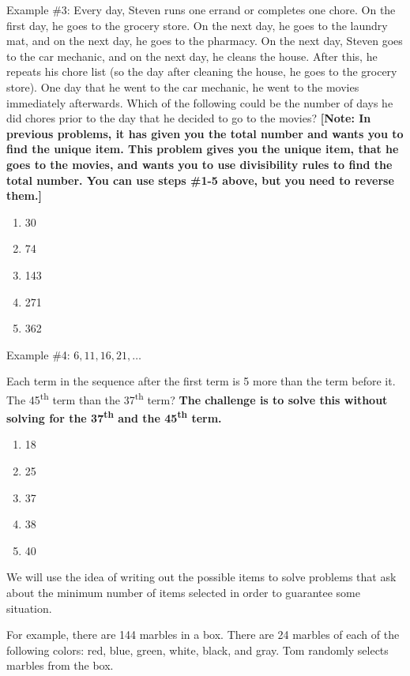 \vfill
Example \#3: Every day, Steven runs one errand or completes one chore. On the first day, he goes to the grocery store. On the next day, he goes to the laundry mat, and on the next day, he goes to the pharmacy. On the next day, Steven goes to the car mechanic, and on the next day, he cleans the house. After this, he repeats his chore list (so the day after cleaning the house, he goes to the grocery store). One day that he went to the car mechanic, he went to the movies immediately afterwards. Which of the following could be the number of days he did chores prior to the day that he decided to go to the movies? \textbf{[Note: In previous problems, it has given you the total number and wants you to find the unique item. This problem gives you the unique item, that he goes to the movies, and wants you to use divisibility rules to find the total number. You can use steps \#1-5 above, but you need to reverse them.]}

\begin{enumerate}[label=(\Alph*)]
\item 30
\item 74
\item 143	%
\item 271
\item 362
\end{enumerate}

\vfill
Example \#4: $6, 11, 16, 21, \ldots$

\bigskip
Each term in the sequence after the first term is 5 more than the term before it. The 45\textsuperscript{th} term than the 37\textsuperscript{th} term? \textbf{The challenge is to solve this without solving for the 37\textsuperscript{th} and the 45\textsuperscript{th} term.}

\begin{enumerate}[label=(\Alph*)]
\item 18
\item 25
\item 37
\item 38
\item 40
\end{enumerate}

\vfill
We will use the idea of writing out the possible items to solve problems that ask about the minimum number of items selected in order to guarantee some situation. 

\bigskip
For example, there are 144 marbles in a box. There are 24 marbles of each of the following colors: red, blue, green, white, black, and gray. Tom randomly selects marbles from the box.

